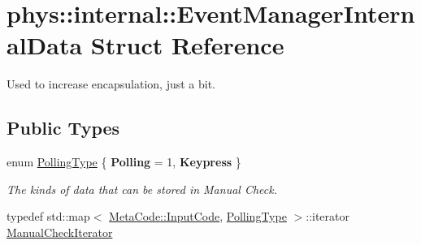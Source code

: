 \hypertarget{structphys_1_1internal_1_1EventManagerInternalData}{
\section{phys::internal::EventManagerInternalData Struct Reference}
\label{d6/d3a/structphys_1_1internal_1_1EventManagerInternalData}
}


Used to increase encapsulation, just a bit.  


\subsection*{Public Types}
\begin{DoxyCompactItemize}
\item 
enum \hyperlink{structphys_1_1internal_1_1EventManagerInternalData_ab9ab8380b84448aacf46a63050e159af}{PollingType} \{ {\bfseries Polling} = 1, 
{\bfseries Keypress}
 \}
\begin{DoxyCompactList}\small\item\em The kinds of data that can be stored in Manual Check. \item\end{DoxyCompactList}\item 
typedef std::map$<$ \hyperlink{classphys_1_1MetaCode_a3e501cbb5bf0f6f1fdb7211465bda8d8}{MetaCode::InputCode}, \hyperlink{structphys_1_1internal_1_1EventManagerInternalData_ab9ab8380b84448aacf46a63050e159af}{PollingType} $>$::iterator \hyperlink{structphys_1_1internal_1_1EventManagerInternalData_ad2b9c7924f32e299846f1d945cb82dc0}{ManualCheckIterator}
\end{DoxyCompactItemize}
